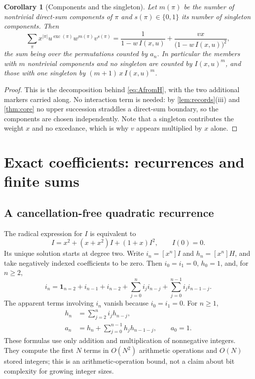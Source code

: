 \documentclass[11pt,letterpaper]{article}
\numberwithin{equation}{section}
\newtheorem{corollary}[theorem]{Corollary}
\theoremstyle{definition}
\DeclareMathOperator{\exc}{exc}
\newcommand{\coeff}[2]{[#1^{#2}]}
\begin{document}
\begin{corollary}[Components and the singleton]
\label{cor:componentref}
Let $m(\pi)$ be the number of nontrivial direct-sum components of $\pi$
and $s(\pi)\in\{0,1\}$ its number of singleton components. Then
\begin{equation}
 \sum_{\pi}x^{|\pi|}u^{\exc(\pi)}w^{m(\pi)}v^{s(\pi)}
  =\frac1{1-w\,I(x,u)}+\frac{vx}{\bigl(1-w\,I(x,u)\bigr)^2},
 \label{eq:componentref}
\end{equation}
the sum being over the permutations counted by $a_n$. In particular the
members with $m$ nontrivial components and no singleton are counted by
$I(x,u)^m$, and those with one singleton by $(m+1)\,x\,I(x,u)^m$.
\end{corollary}
\begin{proof}
This is the decomposition behind \eqref{eq:AfromH}, with the two
additional markers carried along. No interaction term is needed:
by \cref{lem:records}(iii) and \cref{thm:core} no upper succession
straddles a direct-sum boundary, so the components are chosen
independently. Note that a singleton contributes the weight $x$ and no
excedance, which is why $v$ appears multiplied by $x$ alone.
\end{proof}

\section{Exact coefficients: recurrences and finite sums}
\label{sec:coefficients}

\subsection{A cancellation-free quadratic recurrence}

The radical expression for $I$ is equivalent to
\begin{equation}
 \boxed{I=x^2+(x+x^2)I+(1+x)I^2,\qquad I(0)=0.}
 \label{eq:Ipositive}
\end{equation}
Its unique solution starts at degree two. Write $i_n=\coeff{x}{n}I$ and
$h_n=\coeff{x}{n}H$, and take negatively indexed coefficients to be zero.
Then $i_0=i_1=0$, $h_0=1$, and, for $n\ge2$,
\begin{equation}
 i_n=\mathbf1_{n=2}+i_{n-1}+i_{n-2}
       +\sum_{j=0}^n i_ji_{n-j}
       +\sum_{j=0}^{n-1}i_ji_{n-1-j}.
 \label{eq:irec}
\end{equation}
The apparent terms involving $i_n$ vanish because $i_0=i_1=0$.
For $n\ge1$,
\begin{align}
 h_n&=\sum_{j=2}^n i_jh_{n-j},\label{eq:hrec}\\
 a_n&=h_n+\sum_{j=0}^{n-1}h_jh_{n-1-j},\qquad a_0=1.
 \label{eq:arec}
\end{align}
These formulas use only addition and multiplication of nonnegative
integers. They compute the first $N$ terms in $O(N^2)$ arithmetic
operations and $O(N)$ stored integers; this is an arithmetic-operation
bound, not a claim about bit complexity for growing integer sizes.
\end{document}
